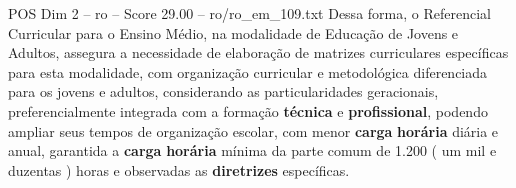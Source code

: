 \begin{textsample}{POS Dim 2 – ro – Score 29.00 – ro/ro\_em\_109.txt}
Dessa forma, o Referencial Curricular para o Ensino Médio, na modalidade de Educação de Jovens e Adultos, assegura a necessidade de elaboração de matrizes curriculares específicas para esta modalidade, com organização curricular e metodológica diferenciada para os jovens e adultos, considerando as particularidades geracionais, preferencialmente integrada com a formação \textbf{técnica} e \textbf{profissional}, podendo ampliar seus tempos de organização escolar, com menor \textbf{carga} \textbf{horária} diária e anual, garantida a \textbf{carga} \textbf{horária} mínima da parte comum de 1.200 ( um mil e duzentas ) horas e observadas as \textbf{diretrizes} específicas.

\end{textsample}
